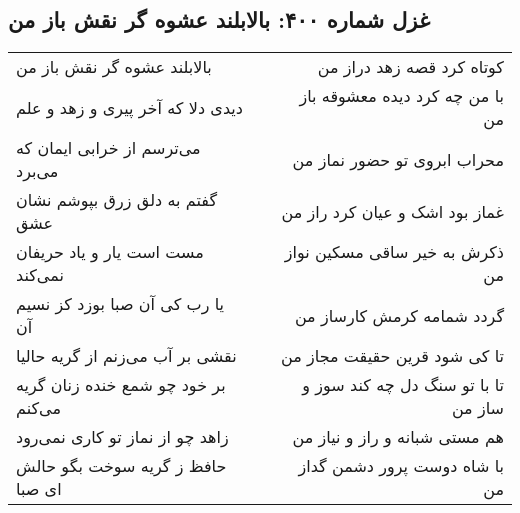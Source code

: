 \begin{center}
\section*{غزل شماره ۴۰۰: بالابلند عشوه گر نقش باز من}
\label{sec:sh400}
\begin{longtable}{l p{0.5cm} r}
بالابلند عشوه گر نقش باز من
&&
کوتاه کرد قصه زهد دراز من
\\
دیدی دلا که آخر پیری و زهد و علم
&&
با من چه کرد دیده معشوقه باز من
\\
می‌ترسم از خرابی ایمان که می‌برد
&&
محراب ابروی تو حضور نماز من
\\
گفتم به دلق زرق بپوشم نشان عشق
&&
غماز بود اشک و عیان کرد راز من
\\
مست است یار و یاد حریفان نمی‌کند
&&
ذکرش به خیر ساقی مسکین نواز من
\\
یا رب کی آن صبا بوزد کز نسیم آن
&&
گردد شمامه کرمش کارساز من
\\
نقشی بر آب می‌زنم از گریه حالیا
&&
تا کی شود قرین حقیقت مجاز من
\\
بر خود چو شمع خنده زنان گریه می‌کنم
&&
تا با تو سنگ دل چه کند سوز و ساز من
\\
زاهد چو از نماز تو کاری نمی‌رود
&&
هم مستی شبانه و راز و نیاز من
\\
حافظ ز گریه سوخت بگو حالش ای صبا
&&
با شاه دوست پرور دشمن گداز من
\\
\end{longtable}
\end{center}
